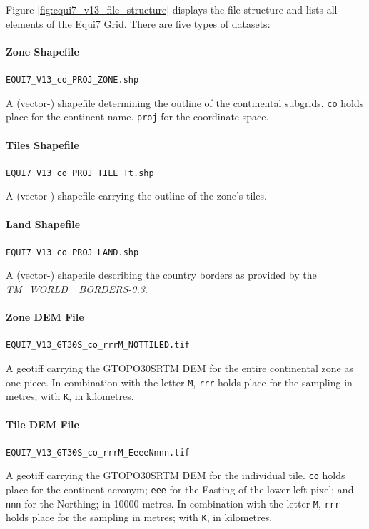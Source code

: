 \documentclass[10pt,a4paper]{article}
\begin{document}
Figure \ref{fig:equi7_v13_file_structure} displays the file structure and lists all elements of the Equi7 Grid. There are five types of datasets:

\paragraph{Zone Shapefile}
\texttt{EQUI7\_V13\_co\_PROJ\_ZONE.shp}

A (vector-) shapefile determining the outline of the continental subgrids. \texttt{co} holds place for the continent name. \texttt{proj} for the coordinate space.

\paragraph{Tiles Shapefile}
\texttt{EQUI7\_V13\_co\_PROJ\_TILE\_Tt.shp}

A (vector-) shapefile carrying the outline of the zone's tiles.

\paragraph{Land Shapefile}
\texttt{EQUI7\_V13\_co\_PROJ\_LAND.shp}

A (vector-) shapefile describing the country borders as provided by the \textit{TM\_WORLD\_ BORDERS-0.3}.

\paragraph{Zone DEM File}
\texttt{EQUI7\_V13\_GT30S\_co\_rrrM\_NOTTILED.tif}

A geotiff carrying the GTOPO30SRTM DEM for the entire continental zone as one piece. In combination with the letter \texttt{M}, \texttt{rrr} holds place for the sampling in metres; with \texttt{K}, in kilometres.

\paragraph{Tile DEM File}
\texttt{EQUI7\_V13\_GT30S\_co\_rrrM\_EeeeNnnn.tif}

A geotiff carrying the GTOPO30SRTM DEM for the individual tile. \texttt{co} holds place for the continent acronym; \texttt{eee} for the Easting of the lower left pixel; and \texttt{nnn} for the Northing; in 10000 metres. In combination with the letter \texttt{M}, \texttt{rrr} holds place for the sampling in metres; with \texttt{K}, in kilometres.
\end{document}
